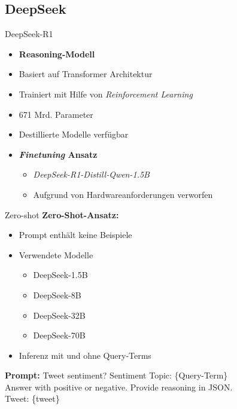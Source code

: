 \documentclass[aspectratio=169]{beamer} %
\begin{document}
\subsection{DeepSeek}

\begin{frame}{DeepSeek-R1}
\begin{itemize}
\item \textbf{Reasoning-Modell}
\item Basiert auf Transformer Architektur
\item Trainiert mit Hilfe von \textit{Reinforcement Learning}
\item 671 Mrd. Parameter
\item Destillierte Modelle verfügbar
\end{itemize}
\vspace{0.4cm}

\begin{itemize}
    \item \textbf{\textit{Finetuning} Ansatz}
    \begin{itemize}
        \item \textit{DeepSeek-R1-Distill-Qwen-1.5B}
        \item Aufgrund von Hardwareanforderungen verworfen
\end{itemize}
\end{itemize}
\end{frame}

\begin{frame}{Zero-shot}
  \textbf{Zero-Shot-Ansatz:}

  \vspace{0.35cm}

  \begin{itemize}
      \item Prompt enthält keine Beispiele
      \item Verwendete Modelle
      \begin{itemize}
          \item DeepSeek-1.5B
          \item DeepSeek-8B
          \item DeepSeek-32B
          \item DeepSeek-70B
      \end{itemize}
      \item Inferenz mit und ohne Query-Terms
  \end{itemize}
  \vspace{0.2cm}
  \centering
  \textbf{Prompt:} Tweet sentiment? Sentiment Topic: \{Query-Term\} \\
  Answer with positive or negative. Provide reasoning in JSON.\\
    Tweet: \glqq\{tweet\}\grqq
\end{frame}
\end{document}
